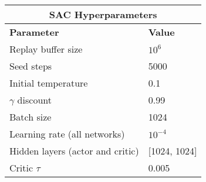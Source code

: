 \begin{table}[h]
\begin{tabular}{|l|l|}
\hline
\multicolumn{2}{|c|}{\textbf{SAC Hyperparameters}} \\ \hline
\textbf{Parameter} & \textbf{Value} \\ \hline
Replay buffer size & $10^6$ \\ \hline
Seed steps & 5000 \\ \hline
Initial temperature & 0.1 \\ \hline
$\gamma$ discount & 0.99 \\ \hline
Batch size & 1024 \\ \hline
Learning rate (all networks) & $10^{-4}$ \\ \hline
Hidden layers (actor and critic) & [1024, 1024] \\ \hline
Critic $\tau$ & 0.005 \\ \hline
\end{tabular}
\end{table}